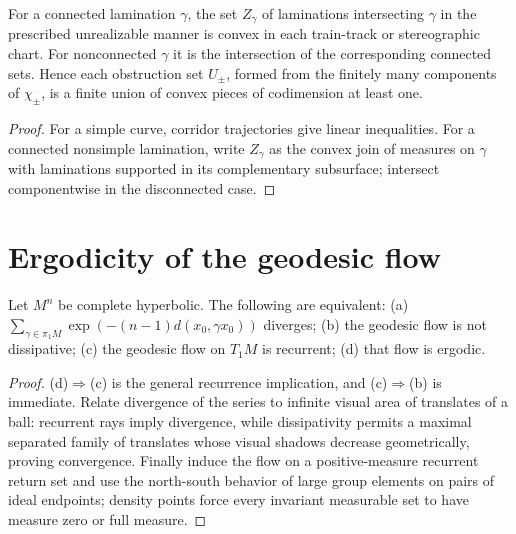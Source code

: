 \begin{proposition}
\label{thurston-ch09-unrealizable-convexity}
 For a connected lamination $\gamma$, the set $Z_\gamma$ of laminations intersecting $\gamma$ in the prescribed unrealizable manner is convex in each train-track or stereographic chart. For nonconnected $\gamma$ it is the intersection of the corresponding connected sets. Hence each obstruction set $U_\pm$, formed from the finitely many components of $\chi_\pm$, is a finite union of convex pieces of codimension at least one.
\end{proposition}
\begin{proof}\sketch For a simple curve, corridor trajectories give linear inequalities. For a connected nonsimple lamination, write $Z_\gamma$ as the convex join of measures on $\gamma$ with laminations supported in its complementary subsurface; intersect componentwise in the disconnected case.\end{proof}

\section{Ergodicity of the geodesic flow}

\begin{theorem}
\label{thurston-ch09-sullivan-ergodicity}
 Let $M^n$ be complete hyperbolic. The following are equivalent: (a) $\sum_{\gamma\in\pi_1M}\exp(-(n-1)d(x_0,\gamma x_0))$ diverges; (b) the geodesic flow is not dissipative; (c) the geodesic flow on $T_1M$ is recurrent; (d) that flow is ergodic.
\end{theorem}
\begin{proof}\sketch (d)$\Rightarrow$(c) is the general recurrence implication, and (c)$\Rightarrow$(b) is immediate. Relate divergence of the series to infinite visual area of translates of a ball: recurrent rays imply divergence, while dissipativity permits a maximal separated family of translates whose visual shadows decrease geometrically, proving convergence. Finally induce the flow on a positive-measure recurrent return set and use the north-south behavior of large group elements on pairs of ideal endpoints; density points force every invariant measurable set to have measure zero or full measure.\end{proof}


